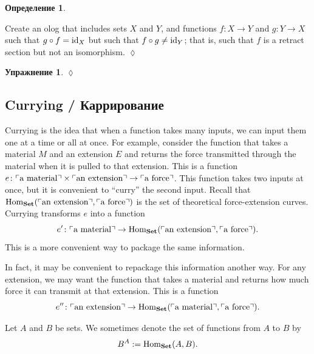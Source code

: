 \documentclass[a4paper]{book}
\def\tn{\textnormal}
\def\Hom{\tn{Hom}}
\def\to{\rightarrow}
\def\taking{\colon}
\newcommand{\fakebox}[1]{\tn{$\ulcorner$#1$\urcorner$}}
\def\id{\tn{id}}
\def\Set{{\bf Set}}
\theoremstyle{myth}
\newtheorem{excENG}[envENG]{\begin{english}Exercise\end{english}}
\newtheorem{notationENG}[envENG]{\begin{english}Notation\end{english}}
\newenvironment{exerciseENG}{\begin{excENG}}{\hspace*{\fill}$\lozenge$\end{excENG}}
\newtheorem{excRUS}[envRUS]{Упражнение}
\newtheorem{definitionRUS}[envRUS]{Определение}
\newenvironment{exerciseRUS}{\begin{excRUS}}{\hspace*{\fill}$\lozenge$\end{excRUS}}
\begin{document}
\begin{russian}
\begin{definitionRUS}
 
\end{definitionRUS}

\begin{exerciseENG}
Create an olog that includes sets $X$ and $Y$, and functions $f\taking X\to Y$ and $g\taking Y\to X$ such that $g\circ f=\id_X$ but such that $f\circ g\neq\id_Y$; that is, such that $f$ is a retract section but not an isomorphism.
\end{exerciseENG}

\begin{exerciseRUS}
 
\end{exerciseRUS}


\subsection{Currying / Каррирование}\label{sec:currying}

Currying is the idea that when a function takes many inputs, we can input them one at a time or all at once. For example, consider the function that takes a material $M$ and an extension $E$ and returns the force transmitted through the material when it is pulled to that extension. This is a function $e\taking \fakebox{a material}\times\fakebox{an extension}\to\fakebox{a force}$. This function takes two inputs at once, but it is convenient to “curry” the second input. Recall that $\Hom_\Set(\fakebox{an extension},\fakebox{a force})$ is the set of theoretical force-extension curves. Currying transforms $e$ into a function $$e'\taking\fakebox{a material}\to\Hom_\Set(\fakebox{an extension},\fakebox{a force}).$$ This is a more convenient way to package the same information. 

 

In fact, it may be convenient to repackage this information another way. For any extension, we may want the function that takes a material and returns how much force it can transmit at that extension. This is a function $$e''\taking\fakebox{an extension}\to\Hom_\Set(\fakebox{a material},\fakebox{a force}).$$ 

 

\begin{notationENG}\index{exponentials ! in $\Set$}
Let $A$ and $B$ be sets. We sometimes denote the set of functions from $A$ to $B$ by 
\begin{align}\label{dia:exponential sets}
B^A:=\Hom_\Set(A,B).
\end{align}
\end{notationENG}


\end{russian}
\end{document}
